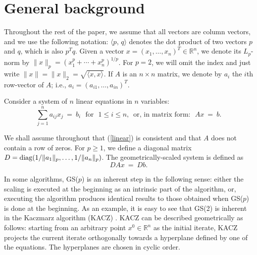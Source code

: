 \documentclass[12pt,a4paper]{article}
\newcounter{i}
\def\real{\mathbb R}
\def\diag{{\rm diag}}
\def\time{\!\times\!}
\def\real{\mathbb R}
\def\diag{{\rm diag}}
\begin{document}
\section{General background}
\label{back}

Throughout the rest of the paper, we assume that all vectors are column
vectors, and we use the following notation:  $\langle p,\, q\rangle$ 
denotes the dot product of two vectors $p$ and $q$, which is also 
$p^T\!q$.  Given a vector $x=(x_1,\ldots,x_n)^T\in\real^n$, we denote 
its $L_p$-norm by $\|x\|_p = (x_1^p+\cdots+x_n^p)^{1/p}$.  
For $p=2$, we will omit the index and just write 
$\|x\|=\|x\|_2=\sqrt{\langle x,x\rangle}$.
If $A$ is an $n\time n$ matrix, we denote by $a_i$ the $i$th 
row-vector of $A$; i.e., $a_i = (a_{i1},\ldots,a_{in})^T$.  

Consider a system of $n$ linear equations in $n$ variables:
\begin{equation}
\sum_{j=1}^n a_{ij}x_j ~=~ b_i \mbox{~~for~~} 1\le i\le n
\mbox{,~~or, in matrix form:~~} Ax~=~b.
\label{linear}
\end{equation}

We shall assume throughout that (\ref{linear}) is consistent and that 
$A$ does not contain a row of zeros.  For $p\ge 1$, we define a diagonal 
matrix $D = \diag(1/\|a_1\|_p,\ldots,1/\|a_n\|_p)$.  The 
geometrically-scaled system is defined as 
\begin{equation}
 D A x ~=~ D b.
\label{scaled}
\end{equation}

In some algorithms, GS($p$) is an inherent step in the following 
sense: either the scaling is executed at the beginning as an 
intrinsic part of the algorithm, or, executing the algorithm 
produces identical results to those obtained when GS($p$) is 
done at the beginning.  As an example, it is easy to see that 
GS(2) is inherent in the Kaczmarz algorithm (KACZ) 
\cite{Kaczmarz37}.  KACZ can be described geometrically as 
follows: starting from an arbitrary point $x^0 \in \real^n$ 
as the initial iterate, KACZ projects the current iterate 
orthogonally towards a hyperplane defined by one of the 
equations.  The hyperplanes are chosen in cyclic order.  
\end{document}
